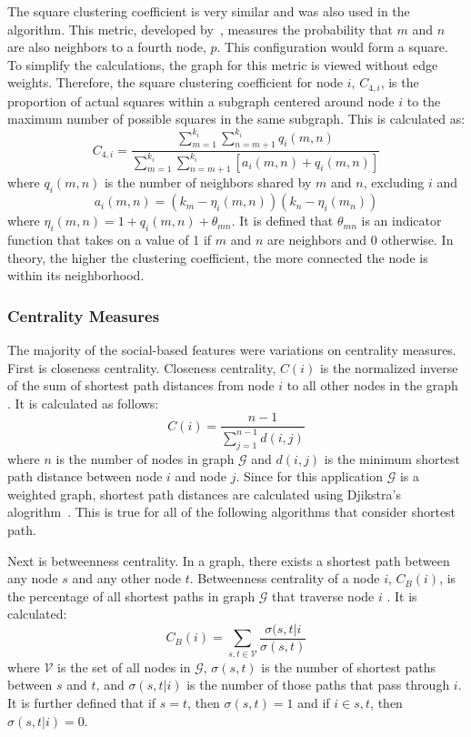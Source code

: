 \documentclass[12pt]{report}
\begin{document}
The square clustering coefficient is very similar and was also used in the algorithm.
This metric, developed by~\cite{lind_cycles_2005}, measures the probability that $m$ and $n$ are also neighbors to a fourth node, $p$.
This configuration would form a square.
To simplify the calculations, the graph for this metric is viewed without edge weights.
Therefore, the square clustering coefficient for node $i$, $C_{4,i}$, is the proportion of actual squares within a subgraph centered around node $i$ to the maximum number of possible squares in the same subgraph.
This is calculated as:
\begin{equation}
C_{4,i} = \frac{\sum_{m=1}^{k_i}\sum_{n=m+1}^{k_i}q_i(m,n)}{\sum_{m=1}^{k_i} \sum_{n=m+1}^{k_i}\left[a_i(m,n)+q_i(m,n) \right]}
\end{equation}
where $q_i(m,n)$ is the number of neighbors shared by $m$ and $n$, excluding $i$ and 
\begin{equation}
a_i(m,n) = (k_m-\eta_i(m,n))(k_n-\eta_i(m_n)) 
\end{equation}
where $\eta_i(m,n) = 1+q_i(m,n)+\theta_{mn}$.  
It is defined that $\theta_{mn}$ is an indicator function that takes on a value of 1 if $m$ and $n$ are neighbors and 0 otherwise.
In theory, the higher the clustering coefficient, the more connected the node is within its neighborhood.

\subsubsection{Centrality Measures}
The majority of the social-based features were variations on centrality measures.
First is closeness centrality.
Closeness centrality, $C(i)$ is the normalized inverse of the sum of shortest path distances from node $i$ to all other nodes in the graph \cite{freeman_centrality_1978}.  It is calculated as follows:
\begin{equation}
C(i) = \frac{n-1}{\sum_{j=1}^{n-1}d(i,j)}
\end{equation}
where $n$ is the number of nodes in graph $\mathcal{G}$ and $d(i,j)$ is the minimum shortest path distance between node $i$ and node $j$.
Since for this application $\mathcal{G}$ is a weighted graph, shortest path distances are calculated using Djikstra's alogrithm~\cite{dijkstra1959note}.
This is true for all of the following algorithms that consider shortest path.

Next is betweenness centrality.
In a graph, there exists a shortest path between any node $s$ and any other node $t$.  Betweenness centrality of a node $i$, $C_B(i)$, is the percentage of all shortest paths in graph $\mathcal{G}$ that traverse node $i$ \cite{freeman_set_1977}.
It is calculated:
\begin{equation}
C_B(i) = \sum_{s,t\in \mathcal{V}}\frac{\sigma(s,t|i}{\sigma(s,t)}
\end{equation}
where $\mathcal{V}$ is the set of all nodes in $\mathcal{G}$, $\sigma(s,t)$ is the number of shortest paths between $s$ and $t$, and $\sigma(s,t|i)$ is the number of those paths that pass through $i$.
It is further defined that if $s=t$, then $\sigma(s,t)=1$ and if $i\in s,t$, then $\sigma(s,t|i) = 0$.
\end{document}
